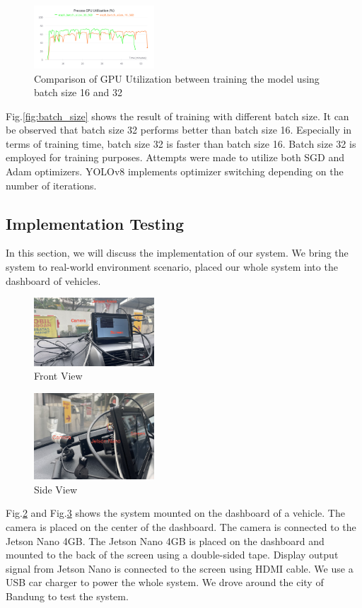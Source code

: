 \documentclass[conference]{IEEEtran}
\begin{document}
\begin{figure}[h!]
\centering
\includegraphics[width=0.4\textwidth,keepaspectratio]{gpu_utilization_comparison.png} 
\caption{Comparison of GPU Utilization between training the model using batch size 16 and 32}
\label{fig:gpu_utilization}
\end{figure}
Fig.\ref{fig:batch_size} shows the result of training with different batch size. It can be observed that batch size 32 performs better than batch size 16. Especially in terms of training time, batch size 32 is faster than batch size 16.
Batch size 32 is employed for training purposes. Attempts were made to utilize both SGD and Adam optimizers. YOLOv8 implements optimizer switching depending on the number of iterations.


\subsection{Implementation Testing}
In this section, we will discuss the implementation of our system. We bring the system to real-world environment scenario, placed our whole system into the dashboard of vehicles.
\begin{figure}[h!]
\centering
\includegraphics[width=0.4\textwidth,keepaspectratio]{mounted_camera_front_view.jpg}
\caption{Front View}
\label{fig:front_view}
\end{figure}

\begin{figure}[h!]
\centering
\includegraphics[width=0.4\textwidth,keepaspectratio]{mounted_camera_side_view.jpg}
\caption{Side View}
\label{fig:side_view}
\end{figure}
Fig.\ref{fig:front_view} and Fig.\ref{fig:side_view} shows the system mounted on the dashboard of a vehicle. 
The camera is placed on the center of the dashboard. The camera is connected to the Jetson Nano 4GB. 
The Jetson Nano 4GB is placed on the dashboard and mounted to the back of the screen using a double-sided tape.
Display output signal from Jetson Nano is connected to the screen using HDMI cable.
We use a USB car charger to power the whole system. We drove around the city of Bandung to test the system. 
\end{document}
